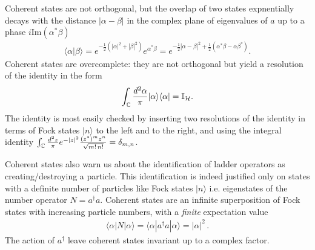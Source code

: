 \documentclass[../QFT_main.tex]{subfiles}
\begin{document}
\begin{mytheorem}
Coherent states are not orthogonal, but the overlap of two states expnentially decays with the distance $|\alpha-\beta|$ in the complex plane of eigenvalues of $a$ up to a phase $i\text{Im}(\alpha^*\beta)$
\begin{align}
    \langle \alpha|\beta\rangle = e^{-\frac{1}{2}(|\alpha|^2 + |\beta|^2)} e^{\alpha^*\beta} = e^{-\frac{1}{2}|\alpha-\beta|^2 +\tfrac12(\alpha^*\beta - \alpha\beta^*)}.
\end{align}
Coherent states are overcomplete: they are not orthogonal but yield a resolution of the identity in the form
\begin{align}
    \int_{\mathbb{C}} \frac{d^2\alpha}{\pi} |\alpha\rangle \langle \alpha| = \mathbb{I}_\mathcal{H}.
\end{align}
The identity is most easily checked by inserting two resolutions of the identity in terms of Fock states $|n\rangle$ to the left and to the right, and using the integral identity $\int_{\mathbb{C}}\frac{d^2z}{\pi} e^{-|z|^2}\frac{(z^*)^mz^n}{\sqrt{m!\,n!}}=\delta_{m,n}$.

Coherent states also warn us about the identification of ladder operators as creating/destroying a particle.
This identification is indeed justified only on states with a definite number of particles like Fock states $|n\rangle$ i.e. eigenstates of the number operator $N = a^\dagger a$.
Coherent states are an infinite superposition of Fock states with increasing particle numbers, with a \emph{finite} expectation value 
\begin{align}
    \langle \alpha| N |\alpha\rangle = \langle \alpha| a^\dagger a |\alpha\rangle = |\alpha|^2\,.
\end{align}
The action of $a^\dagger$ leave coherent states invariant up to a complex factor.


\end{mytheorem}
\end{document}
